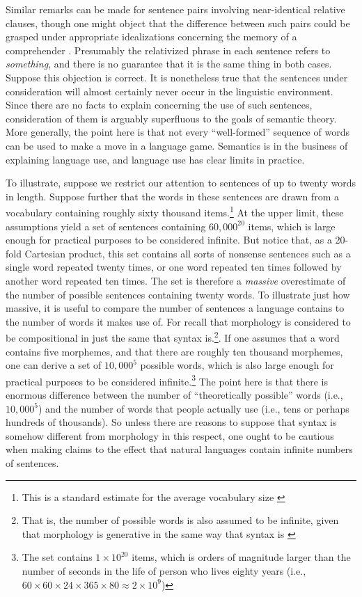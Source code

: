 Similar remarks can be made for sentence pairs involving near-identical relative clauses, though one might object that the difference between such pairs could be grasped under appropriate idealizations concerning the memory of a comprehender \citep{FodorPylyshyn:1988}. Presumably the relativized phrase in each sentence refers to \textit{something}, and there is no guarantee that it is the same thing in both cases. Suppose this objection is correct. It is nonetheless true that the sentences under consideration will almost certainly never occur in the linguistic environment. Since there are no facts to explain concerning the use of such sentences, consideration of them is arguably superfluous to the goals of semantic theory. More generally, the point here is that not every ``well-formed'' sequence of words can be used to make a move in a language game. Semantics is in the business of explaining language use, and language use has clear limits in practice.

To illustrate, suppose we restrict our attention to sentences of up to twenty words in length. Suppose further that the words in these sentences are drawn from a vocabulary containing roughly sixty thousand items.\footnote{This is a standard estimate for the average vocabulary size \citep{Pinker:1994,Harley:2014}} At the upper limit, these assumptions yield a set of sentences containing $60,000^{20}$ items, which is large enough for practical purposes to be considered infinite. But notice that, as a 20-fold Cartesian product, this set contains all sorts of nonsense sentences such as a single word repeated twenty times, or one word repeated ten times followed by another word repeated ten times. The set is therefore a \textit{massive} overestimate of the number of possible sentences containing twenty words. To illustrate just how massive, it is useful to compare the number of sentences a language contains to the number of words it makes use of. For recall that morphology is considered to be compositional in just the same that syntax is.\footnote{That is, the number of possible words is also assumed to be infinite, given that morphology is generative in the same way that syntax is \citep{Pinker:1994}}. If one assumes that a word contains five morphemes, and that there are roughly ten thousand morphemes, one can derive a set of $10,000^{5}$ possible words, which is also large enough for practical purposes to be considered infinite.\footnote{The set contains $1 \times 10^{20}$ items, which is orders of magnitude larger than the number of seconds in the life of person who lives eighty years (i.e., $60 \times 60 \times 24 \times 365 \times 80 \approx 2 \times 10^{9}$)} The point here is that there is enormous difference between the number of ``theoretically possible'' words (i.e., $10,000^{5}$) and the number of words that people actually use (i.e., tens or perhaps hundreds of thousands). So unless there are reasons to suppose that syntax is somehow different from morphology in this respect, one ought to be cautious when making claims to the effect that natural languages contain infinite numbers of sentences.

